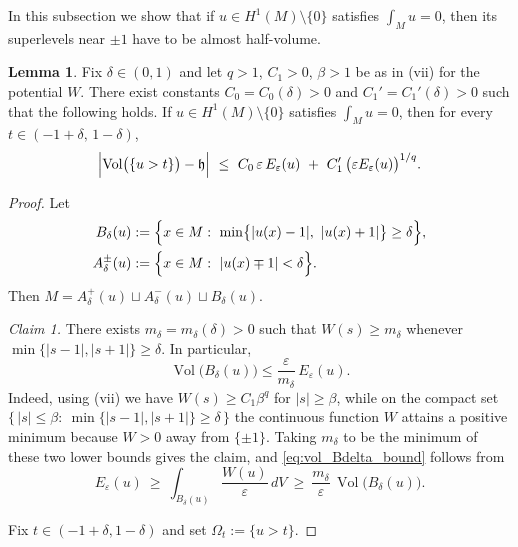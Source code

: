 \documentclass[12pt,english]{article}
\theoremstyle{definition}
\newtheorem{lemma}[theorem]{Lemma}
\begin{document}
In this subsection we show that if $u\in H^{1}(M) \setminus \{0\}$ satisfies $\int_M u =0$, then its superlevels near $\pm 1$ have to be almost half-volume.

\begin{lemma}\label{lem:meanzero_near_half_volume}
Fix $\delta\in(0,1)$ and let $q>1$, $C_1>0$, $\beta>1$ be as in {\rm (vii)} for the potential $W$. There exist constants $C_0=C_0(\delta)>0$ and $C_1'=C_1'(\delta)>0$ such that the following holds. If $u\in H^{1}(M) \setminus \{0\}$ satisfies $\int_M u =0$, then for every $t\in(-1+\delta,\,1-\delta)$,
\[
\Bigl|\operatorname{Vol}\bigl(\{u>t\}\bigr)-\mathfrak h\Bigr|
\ \le\ C_0\,\varepsilon\,E_\varepsilon(u)\ +\ C_1'\,\bigl(\varepsilon E_\varepsilon(u)\bigr)^{1/q}.
\]
\end{lemma}

\begin{proof}
Let
\[
\begin{aligned}
B_\delta(u)
&:=\Bigl\{x\in M:\ 
\min\bigl\{|u(x)-1|,\ |u(x)+1|\bigr\}\ge \delta\Bigr\},\\
A^\pm_\delta(u)
&:=\Bigl\{x\in M:\ |u(x)\mp 1|<\delta\Bigr\}.
\end{aligned}
\]
Then $M=A^+_\delta(u)\sqcup A^-_\delta(u)\sqcup B_\delta(u)$.

\smallskip
\noindent\emph{Claim 1.} There exists $m_\delta=m_\delta(\delta)>0$ such that
$W(s)\ge m_\delta$ whenever $\min\{|s-1|,|s+1|\}\ge\delta$. In particular,
\begin{equation}\label{eq:vol_Bdelta_bound}
\operatorname{Vol}\bigl(B_\delta(u)\bigr)\le \frac{\varepsilon}{m_\delta}\,E_\varepsilon(u).
\end{equation}
Indeed, using {\rm (vii)} we have $W(s)\ge C_1\beta^q$ for $|s|\ge \beta$, while on the compact set
$\{\,|s|\le\beta:\ \min\{|s-1|,|s+1|\}\ge\delta\,\}$ the continuous function $W$ attains a positive minimum
because $W>0$ away from $\{\pm1\}$. Taking $m_\delta$ to be the minimum of these two lower bounds gives the claim,
and \eqref{eq:vol_Bdelta_bound} follows from
\[
E_\varepsilon(u)\ \ge\ \int_{B_\delta(u)}\frac{W(u)}{\varepsilon}\,dV\ \ge\ \frac{m_\delta}{\varepsilon}\,\operatorname{Vol}\bigl(B_\delta(u)\bigr).
\]

\smallskip
Fix $t\in(-1+\delta,1-\delta)$ and set $\Omega_t:=\{u>t\}$.


\end{proof}
\end{document}
